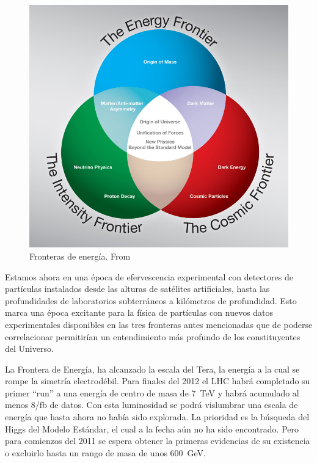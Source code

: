 \begin{figure}
  \centering
\includegraphics[scale=0.3]{three-frontiers-large}
  \caption{Fronteras de energía. From \cite{fermilab}}
  \label{fig:1}
\end{figure}

Estamos ahora en una época de efervescencia experimental con
detectores de partículas instalados desde las alturas de satélites
artificiales, hasta las profundidades de laboratorios subterráneos a
kilómetros de profundidad. Esto marca una época excitante para la
física de partículas con nuevos datos experimentales disponibles en
las tres fronteras antes mencionadas que de poderse correlacionar
permitirían un entendimiento más profundo de los constituyentes del
Universo.  

La Frontera de Energía, ha alcanzado la escala del Tera, la energía a
la cual se rompe la simetría electrodébil. Para finales del 2012 el
LHC habrá completado su primer ``run'' a una energía de centro de masa
de 7~TeV y habrá acumulado al menos 8/fb de datos. Con esta
luminosidad se podrá vislumbrar una escala de energía que hasta ahora
no había sido explorada. La prioridad es la búsqueda del Higgs del
Modelo Estándar, el cual a la fecha aún no ha sido encontrado. Pero
para comienzos del 2011 se espera obtener la primeras evidencias de su
existencia o excluirlo hasta un rango de masa de unos 600~GeV.

